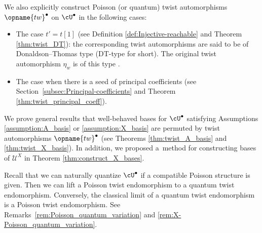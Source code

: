 \documentclass[pdftex]{sigma}
\renewcommand{\tw}{\opname{tw}}
\newcommand{\XClAlg}{\mathcal{U}^X}
\renewcommand{\tw}{\opname{tw}}
\numberwithin{equation}{section}
\begin{document}
We also explicitly construct Poisson (or quantum) twist automorphisms $\tw^{\bullet}$
on $\cU^{\bullet}$ in the following cases:
\begin{itemize}\itemsep=0pt
\item The case $t'=t[1]$ (see Definition \ref{def:Injective-reachable} and Theorem
\ref{thm:twist_DT}): the corresponding twist automorphisms are said
to be of Donaldson--Thomas type (DT-type for short). The original twist
automorphism $\eta_{w}$ is of this type \cite{qin2020dual}.
\item The case when there is a seed of principal coefficients (see Section~\ref{subsec:Principal-coefficients} and
Theorem \ref{thm:twist_principal_coeff}).
\end{itemize}
We prove general results that well-behaved bases for $\cU^{\bullet}$ satisfying Assumptions \ref{assumption:A_basis} or \ref{assumption:X_basis}
are permuted by twist automorphisms $\tw^{\bullet}$ (see Theorems \ref{thm:twist_A_basis}
and \ref{thm:twist_X_basis}). In addition, we proposed a~method for constructing bases of $\XClAlg$ in Theorem \ref{thm:construct_X_bases}.

Recall that we can naturally quantize $\cU^{\bullet}$ if a compatible Poisson
structure is given. Then we can lift a Poisson twist endomorphism
to a quantum twist endomorphism. Conversely, the classical limit of a quantum twist endomorphism is a Poisson twist endomorphism. See Remarks~\ref{rem:Poisson_quantum_variation} and \ref{rem:X-Poisson_quantum_variation}.
\end{document}
